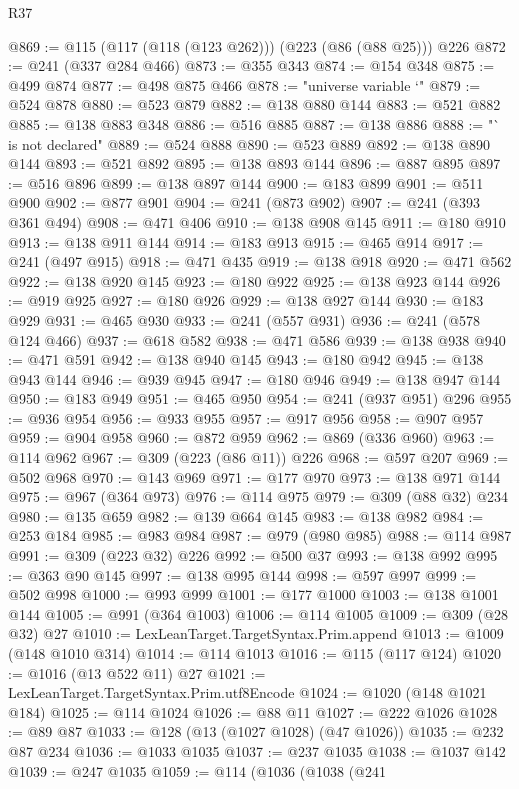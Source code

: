 \begin{lexlean}{R37}
\begin{coremodule}
@869 := @115 (@117 (@118 (@123 @262))) (@223 (@86 (@88 @25))) @226
@872 := @241 (@337 @284 @466)
@873 := @355 @343
@874 := @154 @348
@875 := @499 @874
@877 := @498 @875 @466
@878 := "universe variable `"
@879 := @524 @878
@880 := @523 @879
@882 := @138 @880 @144
@883 := @521 @882
@885 := @138 @883 @348
@886 := @516 @885
@887 := @138 @886
@888 := "` is not declared"
@889 := @524 @888
@890 := @523 @889
@892 := @138 @890 @144
@893 := @521 @892
@895 := @138 @893 @144
@896 := @887 @895
@897 := @516 @896
@899 := @138 @897 @144
@900 := @183 @899
@901 := @511 @900
@902 := @877 @901
@904 := @241 (@873 @902)
@907 := @241 (@393 @361 @494)
@908 := @471 @406
@910 := @138 @908 @145
@911 := @180 @910
@913 := @138 @911 @144
@914 := @183 @913
@915 := @465 @914
@917 := @241 (@497 @915)
@918 := @471 @435
@919 := @138 @918
@920 := @471 @562
@922 := @138 @920 @145
@923 := @180 @922
@925 := @138 @923 @144
@926 := @919 @925
@927 := @180 @926
@929 := @138 @927 @144
@930 := @183 @929
@931 := @465 @930
@933 := @241 (@557 @931)
@936 := @241 (@578 @124 @466)
@937 := @618 @582
@938 := @471 @586
@939 := @138 @938
@940 := @471 @591
@942 := @138 @940 @145
@943 := @180 @942
@945 := @138 @943 @144
@946 := @939 @945
@947 := @180 @946
@949 := @138 @947 @144
@950 := @183 @949
@951 := @465 @950
@954 := @241 (@937 @951) @296
@955 := @936 @954
@956 := @933 @955
@957 := @917 @956
@958 := @907 @957
@959 := @904 @958
@960 := @872 @959
@962 := @869 (@336 @960)
@963 := @114 @962
@967 := @309 (@223 (@86 @11)) @226
@968 := @597 @207
@969 := @502 @968
@970 := @143 @969
@971 := @177 @970
@973 := @138 @971 @144
@975 := @967 (@364 @973)
@976 := @114 @975
@979 := @309 (@88 @32) @234
@980 := @135 @659
@982 := @139 @664 @145
@983 := @138 @982
@984 := @253 @184
@985 := @983 @984
@987 := @979 (@980 @985)
@988 := @114 @987
@991 := @309 (@223 @32) @226
@992 := @500 @37
@993 := @138 @992
@995 := @363 @90 @145
@997 := @138 @995 @144
@998 := @597 @997
@999 := @502 @998
@1000 := @993 @999
@1001 := @177 @1000
@1003 := @138 @1001 @144
@1005 := @991 (@364 @1003)
@1006 := @114 @1005
@1009 := @309 (@28 @32) @27
@1010 := LexLeanTarget.TargetSyntax.Prim.append
@1013 := @1009 (@148 @1010 @314)
@1014 := @114 @1013
@1016 := @115 (@117 @124)
@1020 := @1016 (@13 @522 @11) @27
@1021 := LexLeanTarget.TargetSyntax.Prim.utf8Encode
@1024 := @1020 (@148 @1021 @184)
@1025 := @114 @1024
@1026 := @88 @11
@1027 := @222 @1026
@1028 := @89 @87
@1033 := @128 (@13 (@1027 @1028) (@47 @1026))
@1035 := @232 @87 @234
@1036 := @1033 @1035
@1037 := @237 @1035
@1038 := @1037 @142
@1039 := @247 @1035
@1059 := @114
    (@1036
      (@1038
        (@241

\end{coremodule}
\end{lexlean}
